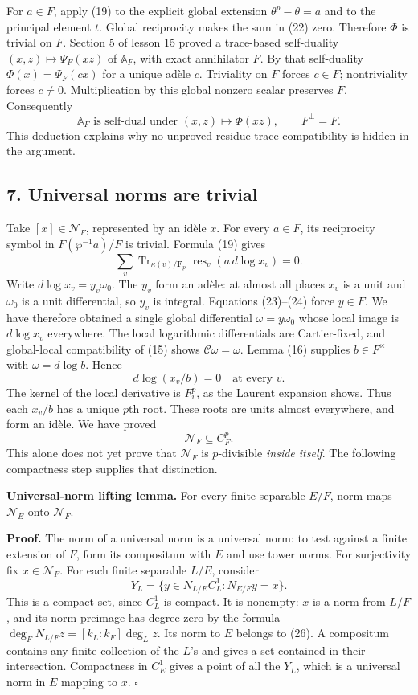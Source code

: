 \documentclass[11pt,a4paper]{article}
\begin{document}
For \(a\in F\), apply (19) to the explicit global extension
\(\theta^p-\theta=a\) and to the principal element \(t\). Global
reciprocity makes the sum in (22) zero. Therefore \(\Phi\) is trivial on
\(F\). Section 5 of lesson 15 proved a trace-based self-duality
\((x,z)\mapsto\Psi_F(xz)\) of \(\mathbb A_F\), with exact annihilator
\(F\). By that self-duality \(\Phi(x)=\Psi_F(cx)\) for a unique adèle
\(c\). Triviality on \(F\) forces \(c\in F\); nontriviality forces
\(c\ne0\). Multiplication by this global nonzero scalar preserves \(F\).
Consequently \[
\mathbb A_F\text{ is self-dual under }(x,z)\mapsto\Phi(xz),
\qquad F^\perp=F.
\tag{23}
\] This deduction explains why no unproved residue-trace compatibility
is hidden in the argument.

\subsection{7. Universal norms are
trivial}\label{universal-norms-are-trivial}

Take \([x]\in\mathcal N_F\), represented by an idèle \(x\). For every
\(a\in F\), its reciprocity symbol in \(F(\wp^{-1}a)/F\) is trivial.
Formula (19) gives \[
\sum_v\operatorname{Tr}_{\kappa(v)/\mathbf F_p}
\operatorname{res}_v(a\,d\log x_v)=0.
\tag{24}
\] Write \(d\log x_v=y_v\omega_0\). The \(y_v\) form an adèle: at almost
all places \(x_v\) is a unit and \(\omega_0\) is a unit differential, so
\(y_v\) is integral. Equations (23)--(24) force \(y\in F\). We have
therefore obtained a single global differential \(\omega=y\omega_0\)
whose local image is \(d\log x_v\) everywhere. The local logarithmic
differentials are Cartier-fixed, and global-local compatibility of (15)
shows \(\mathcal C\omega=\omega\). Lemma (16) supplies \(b\in F^\times\)
with \(\omega=d\log b\). Hence \[
d\log(x_v/b)=0\quad\text{at every }v.
\] The kernel of the local derivative is \(F_v^p\), as the Laurent
expansion shows. Thus each \(x_v/b\) has a unique \(p\)th root. These
roots are units almost everywhere, and form an idèle. We have proved \[
\mathcal N_F\subseteq C_F^p.
\tag{25}
\] This alone does not yet prove that \(\mathcal N_F\) is
\(p\)-divisible \emph{inside itself}. The following compactness step
supplies that distinction.

\textbf{Universal-norm lifting lemma.} For every finite separable
\(E/F\), norm maps \(\mathcal N_E\) onto \(\mathcal N_F\).

\textbf{Proof.} The norm of a universal norm is a universal norm: to
test against a finite extension of \(F\), form its compositum with \(E\)
and use tower norms. For surjectivity fix \(x\in\mathcal N_F\). For each
finite separable \(L/E\), consider \[
Y_L=\{y\in N_{L/E}C_L^1:N_{E/F}y=x\}.
\tag{26}
\] This is a compact set, since \(C_L^1\) is compact. It is nonempty:
\(x\) is a norm from \(L/F\), and its norm preimage has degree zero by
the formula \(\deg_F N_{L/F}z=[k_L:k_F]\deg_L z\). Its norm to \(E\)
belongs to (26). A compositum contains any finite collection of the
\(L\)'s and gives a set contained in their intersection. Compactness in
\(C_E^1\) gives a point of all the \(Y_L\), which is a universal norm in
\(E\) mapping to \(x\). \(\square\)
\end{document}
